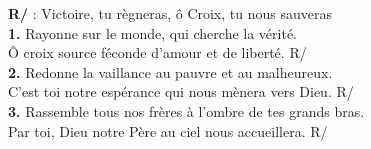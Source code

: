 \textbf{R/} : Victoire, tu règneras, ô Croix, tu nous sauveras\\
\textbf{1.} Rayonne sur le monde, qui cherche la vérité.\\
Ô croix source féconde d’amour et de liberté. R/\\
\textbf{2.} Redonne la vaillance au pauvre et au malheureux.\\
C’est toi notre espérance qui nous mènera vers Dieu. R/\\
\textbf{3.} Rassemble tous nos frères à l’ombre de tes grands bras.\\
Par toi, Dieu notre Père au ciel nous accueillera. R/
